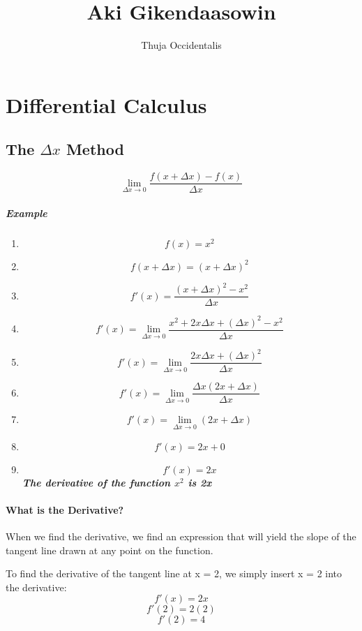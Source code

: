 \documentclass[a4paper,11pt]{book}
\title{Aki Gikendaasowin}
\author{Thuja Occidentalis}
\begin{document}
\maketitle
\tableofcontents

\chapter{Differential Calculus}
\section{The $ \Delta x $ Method}
\LARGE 
\[ \lim_{\Delta x \to 0} \frac{f(x + \Delta x) - f(x)}{\Delta x} \]

\paragraph{Example}
\begin{enumerate}
  \item \[ f(x) = x^2 \]
  \item \[ f(x + \Delta x) = (x + \Delta x)^2 \]
  \item \[ f'(x) = \frac{(x + \Delta x)^2 - x^2}{\Delta x} \]
  \item \[ f'(x) = \lim_{\Delta x \to 0} \frac{x^2 + 2x\Delta x + (\Delta x)^2 - x^2}{\Delta x} \]
  \item \[ f'(x) = \lim_{\Delta x \to 0} \frac{2x\Delta x + (\Delta x)^2}{\Delta x} \]
  \item \[ f'(x) = \lim_{\Delta x \to 0} \frac{\Delta x (2x +\Delta x)}{\Delta x} \]  
  \item \[ f'(x) = \lim_{\Delta x \to 0} (2x +\Delta x) \]
  \item \[ f'(x) = 2x + 0 \]
  \item \[ f'(x) = 2x \]
  \large 
  \textit{\textbf{The derivative of the function $ x^2 $ is 2x}}
\end{enumerate}

\subsubsection{What is the Derivative?}
\normalsize 
When we find the derivative, we find an expression that will yield the slope of the tangent line drawn at any point on the function.

To find the derivative of the tangent line at x = 2, we simply insert x = 2 into the derivative:
\LARGE 
\[ f'(x) = 2x \]
\[ f'(2) = 2(2) \]
\[ f'(2) = 4 \]
\end{document}
